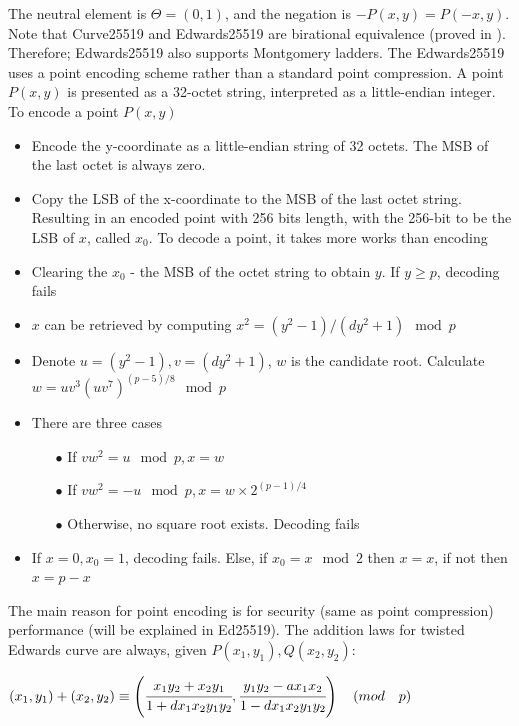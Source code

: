The neutral element is $\Theta = (0,1)$, and the negation is $-P(x, y) = P(-x, y)$. Note that Curve25519 and Edwards25519 are birational equivalence (proved in \cite{Bernstein2011}). Therefore; Edwards25519 also supports Montgomery ladders. The Edwards25519 uses a point encoding scheme rather than a standard point compression. A point $P(x, y)$ is presented as a 32-octet string, interpreted as a little-endian integer. To encode a point $P(x, y)$\\

\begin{itemize}
  \item Encode the y-coordinate as a little-endian string of 32 octets. The MSB of the last octet is always zero.
  \item Copy the LSB of the x-coordinate to the MSB of the last octet string.
        Resulting in an encoded point with 256 bits length, with the 256-bit to be the LSB of $x$, called $x_0$. To decode a point, it takes more works than encoding
  \item Clearing the $x_0$ - the MSB of the octet string to obtain $y$. If $y \geq p$, decoding fails
  \item $x$ can be retrieved by computing $x^2 = (y^2 - 1)/(dy^2 + 1) \mod p$
  \item Denote $u = (y^2-1), v = (dy^2 + 1)$, $w$ is the candidate root. Calculate $w = uv^3(uv^7)^{(p-5)/8} \mod p$
  \item There are three cases

        \begin{itemize}
          \item[$\bullet$] If $vw^2 = u \mod p, x = w$
          \item[$\bullet$] If $vw^2 = -u \mod p, x = w \times 2^{(p-1)/4}$
          \item[$\bullet$] Otherwise, no square root exists. Decoding fails
        \end{itemize}

  \item If $x = 0,x_0 = 1$, decoding fails. Else, if $x_0 = x \mod 2$ then $x = x$, if not then $x = p - x$
\end{itemize}

The main reason for point encoding is for security (same as point compression) performance (will be explained in Ed25519). The addition laws for twisted Edwards curve are always, given $P(x_1, y_1), Q(x_2, y_2)$:

\hspace{0.25cm}
\begin{center}
  $(x_1, y_1) + (x_2, y_2) \equiv \left(\cfrac{x_1y_2 + x_2y_1}{1 + dx_1x_2y_1y_2}, \cfrac{y_1y_2 - ax_1x_2}{1 - dx_1x_2y_1y_2}\right) \quad (mod \quad p) $
\end{center}
\hspace{0.25cm}

